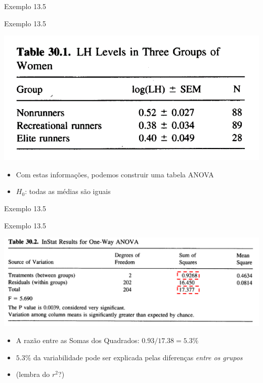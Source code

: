 \documentclass{beamer}
\begin{document}
\begin{frame}[label=exemplo13.5-tabela]{\scriptsize Exemplo 13.5}
  \begin{exampleblock}{Exemplo 13.5}
    \footnotesize
    \begin{center}
      \includegraphics[width=.6\textwidth]{Cap13-30/exemplo13_5-1}
    \end{center}
    \begin{itemize}
      \footnotesize
    \item Com estas informações, podemos construir uma tabela ANOVA
      \small
    \item $H_0$: todas as médias são iguais
    \end{itemize}
  \end{exampleblock}
\end{frame}

\begin{frame}{\scriptsize Exemplo 13.5}
  \begin{exampleblock}{Exemplo 13.5}
    \footnotesize
    \begin{center}
      \includegraphics[width=.8\textwidth]{Cap13-30/exemplo13_5-2}
    \end{center}
    \bigskip
    \begin{itemize}
      \scriptsize
    \item A razão entre as Somas dos Quadrados: $0.93/17.38 = 5.3\%$
    \item $5.3\%$ da variabilidade pode ser explicada pelas diferenças {\em entre os grupos}
    \item (lembra do $r^2$?)
    \end{itemize}
  \end{exampleblock}
\end{frame}
\end{document}
